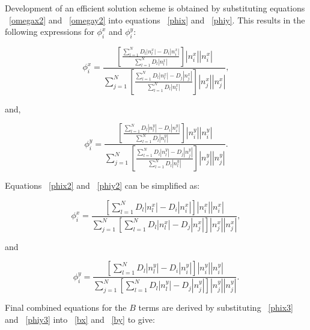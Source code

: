 Development of an efficient solution scheme is obtained by substituting equations ~\ref{omegax2} and ~\ref{omegay2} into equations ~\ref{phix} and ~\ref{phiy}.  This results in the following expressions for $\phi_i^x$ and $\phi_i^y$:

\begin{equation}
\label{phix2}
\phi_i^x =  \frac{\left [ \frac{\sum_{l=1}^N D_l  \left | n_l^x \right |  - D_i \left | n_i^x \right | }{\sum_{l=1}^N D_l  \left | n_l^x \right | } \right ] \left | n_i^x \right | \left | n_i^x \right | }{\sum_{j=1}^N \left [ \frac{\sum_{l=1}^N D_l  \left | n_l^x \right |  - D_j \left | n_j^x \right | }{\sum_{l=1}^N D_l  \left | n_l^x \right | }  \right ] \left | n_j^x \right |  \left | n_j^x \right |  } ,
\end{equation}

and,

\begin{equation}
\label{phiy2}
\phi_i^y =  \frac{\left [ \frac{\sum_{l=1}^N D_l  \left | n_l^y \right |  - D_i \left | n_i^y \right | }{\sum_{l=1}^N D_l  \left | n_l^y \right | } \right ] \left | n_i^y \right | \left | n_i^y \right | }{\sum_{j=1}^N \left [ \frac{\sum_{l=1}^N D_l  \left | n_l^y \right |  - D_j \left | n_j^y \right | }{\sum_{l=1}^N D_l  \left | n_l^y \right | } \right ] \left | n_j^y \right |  \left | n_j^y \right |  } .
\end{equation}

Equations ~\ref{phix2} and ~\ref{phiy2} can be simplified as:

\begin{equation}
\label{phix3}
\phi_i^x =  \frac{\left [ \sum_{l=1}^N D_l  \left | n_l^x \right |  - D_i \left | n_i^x \right |  \right ] \left | n_i^x \right | \left | n_i^x \right | }{\sum_{j=1}^N \left [ \sum_{l=1}^N D_l  \left | n_l^x \right |  - D_j \left | n_j^x \right | \right ] \left | n_j^x \right |  \left | n_j^x \right |  } ,
\end{equation}

and

\begin{equation}
\label{phiy3}
\phi_i^y =  \frac{\left [ \sum_{l=1}^N D_l  \left | n_l^y \right |  - D_i \left | n_i^y \right |  \right ] \left | n_i^y \right | \left | n_i^y \right | }{\sum_{j=1}^N \left [ \sum_{l=1}^N D_l  \left | n_l^y \right |  - D_j \left | n_j^y \right | \right ] \left | n_j^y \right |  \left | n_j^y \right |  } .
\end{equation}

Final combined equations for the $B$ terms are derived by substituting ~\ref{phix3} and ~\ref{phiy3} into ~\ref{bx} and ~\ref{by} to give:

